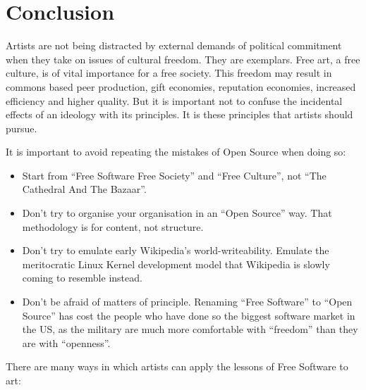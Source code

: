 \documentclass[11pt, a4]{article}
\begin{document}
\section{Conclusion}

Artists are not being distracted by external demands of political commitment when they take on issues of cultural freedom. They are exemplars. Free art, a free culture, is of vital importance for a free society. This freedom may result in commons based peer production, gift economies, reputation economies, increased efficiency and higher quality. But it is important not to confuse the incidental effects of an ideology with its principles. It is these principles that artists should pursue.

It is important to avoid repeating the mistakes of Open Source when doing so:

\begin{itemize}
\item Start from ``Free Software Free Society'' and ``Free Culture'', not ``The Cathedral And The Bazaar''. 

\item Don't try to organise your organisation in an ``Open Source'' way. That methodology is for content, not structure.

\item Don't try to emulate early Wikipedia's world-writeability. Emulate the meritocratic Linux Kernel development model that Wikipedia is slowly coming to resemble instead.

\item Don't be afraid of matters of principle. Renaming ``Free Software'' to ``Open Source'' has cost the people who have done so the biggest software market in the US, as the military are much more comfortable with ``freedom'' than they are with ``openness''.
\end{itemize}

There are many ways in which artists can apply the lessons of Free Software to art:
\end{document}
